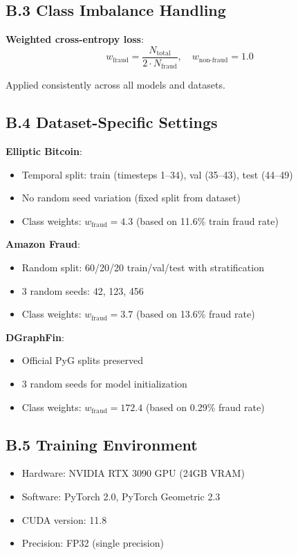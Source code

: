 \subsection*{B.3 Class Imbalance Handling}

\textbf{Weighted cross-entropy loss}:
\begin{equation}
w_{\text{fraud}} = \frac{N_{\text{total}}}{2 \cdot N_{\text{fraud}}}, \quad w_{\text{non-fraud}} = 1.0
\end{equation}

Applied consistently across all models and datasets.

\subsection*{B.4 Dataset-Specific Settings}

\textbf{Elliptic Bitcoin}:
\begin{itemize}
\item Temporal split: train (timesteps 1--34), val (35--43), test (44--49)
\item No random seed variation (fixed split from dataset)
\item Class weights: $w_{\text{fraud}} = 4.3$ (based on 11.6\% train fraud rate)
\end{itemize}

\textbf{Amazon Fraud}:
\begin{itemize}
\item Random split: 60/20/20 train/val/test with stratification
\item 3 random seeds: 42, 123, 456
\item Class weights: $w_{\text{fraud}} = 3.7$ (based on 13.6\% fraud rate)
\end{itemize}

\textbf{DGraphFin}:
\begin{itemize}
\item Official PyG splits preserved
\item 3 random seeds for model initialization
\item Class weights: $w_{\text{fraud}} = 172.4$ (based on 0.29\% fraud rate)
\end{itemize}

\subsection*{B.5 Training Environment}

\begin{itemize}
\item Hardware: NVIDIA RTX 3090 GPU (24GB VRAM)
\item Software: PyTorch 2.0, PyTorch Geometric 2.3
\item CUDA version: 11.8
\item Precision: FP32 (single precision)
\end{itemize}

